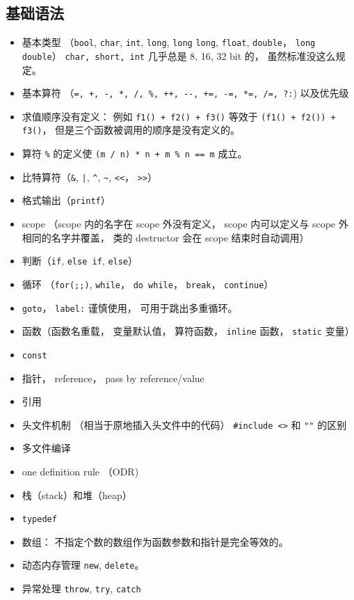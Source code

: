 \subsection{基础语法}
\begin{itemize}
\item 基本类型 （\verb|bool|, \verb|char|, \verb|int|, \verb|long|, \verb|long| \verb|long|, \verb|float|, \verb|double|， \verb|long double|） \verb|char, short, int| 几乎总是 8, 16, 32 bit 的， 虽然标准没这么规定。
\item 基本算符 （\verb|=, +, -, *, /, %, ++, --, +=, -=, *=, /=, ?:|) 以及优先级
\item 求值顺序没有定义： 例如 \verb|f1() + f2() + f3()| 等效于 \verb|(f1() + f2()) + f3()|， 但是三个函数被调用的顺序是没有定义的。
\item 算符 \verb|%| 的定义使 \verb|(m / n) * n + m % n == m| 成立。
\item 比特算符（\verb|&|, \verb+|+, \verb|^|, \verb|~|, \verb|<<|， \verb|>>|）
\item 格式输出（\verb|printf|）
\item scope （scope 内的名字在 scope 外没有定义， scope 内可以定义与 scope 外相同的名字并覆盖， 类的 destructor 会在 scope 结束时自动调用）
\item 判断（\verb|if|, \verb|else if|, \verb|else|）
\item 循环 （\verb|for(;;)|, \verb|while|， \verb|do while|， \verb|break|， \verb|continue|）
\item \verb|goto|， \verb|label:| 谨慎使用， 可用于跳出多重循环。
\item 函数（函数名重载， 变量默认值， 算符函数， \verb|inline| 函数， \verb|static| 变量）
\item \verb|const|
\item 指针， reference， pass by reference/value
\item 引用
\item 头文件机制 （相当于原地插入头文件中的代码） \verb|#include <>| 和 \verb|""| 的区别
\item 多文件编译
\item one definition rule （ODR)
\item 栈（stack）和堆（heap）
\item \verb|typedef|
\item 数组： 不指定个数的数组作为函数参数和指针是完全等效的。
\item 动态内存管理 \verb|new|, \verb|delete|。
\item 异常处理 \verb|throw|, \verb|try|, \verb|catch|
\end{itemize}

